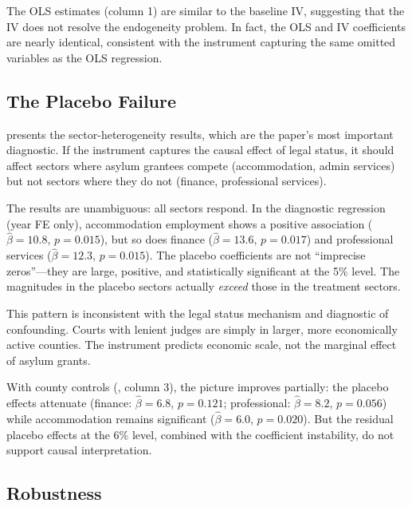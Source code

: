 \documentclass[12pt]{article}
\begin{document}
The OLS estimates (column 1) are similar to the baseline IV, suggesting that the IV does not resolve the endogeneity problem. In fact, the OLS and IV coefficients are nearly identical, consistent with the instrument capturing the same omitted variables as the OLS regression.

\subsection{The Placebo Failure}



 presents the sector-heterogeneity results, which are the paper's most important diagnostic. If the instrument captures the causal effect of legal status, it should affect sectors where asylum grantees compete (accommodation, admin services) but not sectors where they do not (finance, professional services).

The results are unambiguous: all sectors respond. In the diagnostic regression (year FE only), accommodation employment shows a positive association ($\hat{\beta} = 10.8$, $p = 0.015$), but so does finance ($\hat{\beta} = 13.6$, $p = 0.017$) and professional services ($\hat{\beta} = 12.3$, $p = 0.015$). The placebo coefficients are not ``imprecise zeros''---they are large, positive, and statistically significant at the 5\% level. The magnitudes in the placebo sectors actually \textit{exceed} those in the treatment sectors.

This pattern is inconsistent with the legal status mechanism and diagnostic of confounding. Courts with lenient judges are simply in larger, more economically active counties. The instrument predicts economic scale, not the marginal effect of asylum grants.

With county controls (, column 3), the picture improves partially: the placebo effects attenuate (finance: $\hat{\beta} = 6.8$, $p = 0.121$; professional: $\hat{\beta} = 8.2$, $p = 0.056$) while accommodation remains significant ($\hat{\beta} = 6.0$, $p = 0.020$). But the residual placebo effects at the 6\% level, combined with the coefficient instability, do not support causal interpretation.

\subsection{Robustness}


\end{document}
